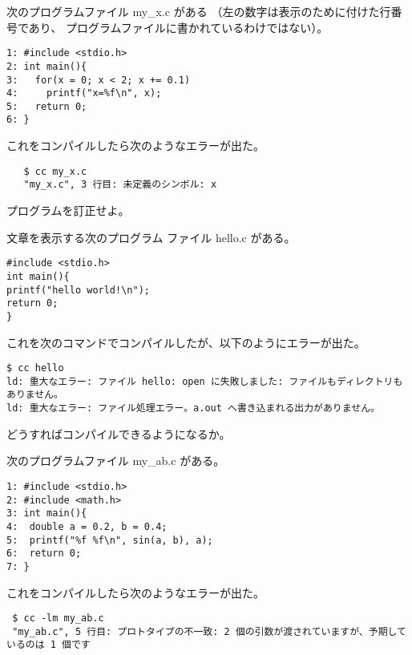 \documentclass[12pt,a4j]{jarticle}
\newcounter{toi}
\def\toi{%
\bigskip\bigskip\noindent
\addtocounter{toi}{1}
\shadowbox{\bfseries\large 問\thetoi}
\nopagebreak[4]\bigskip\nopagebreak[4]
}
\begin{document}


\toi


次のプログラムファイル {\ttfamily my\_x.c} がある
（左の数字は表示のために付けた行番号であり、
プログラムファイルに書かれているわけではない）。
\begin{verbatim}
1: #include <stdio.h>
2: int main(){
3:   for(x = 0; x < 2; x += 0.1)
4:     printf("x=%f\n", x);
5:   return 0;
6: }
\end{verbatim}
これをコンパイルしたら次のようなエラーが出た。
\begin{verbatim}
   $ cc my_x.c
   "my_x.c", 3 行目: 未定義のシンボル: x
\end{verbatim}
プログラムを訂正せよ。






\toi



文章を表示する次のプログラム
ファイル {\ttfamily hello.c} がある。
\begin{verbatim}
#include <stdio.h>
int main(){
printf("hello world!\n");
return 0;
}
\end{verbatim}
これを次のコマンドでコンパイルしたが、以下のようにエラーが出た。

\begin{verbatim}
$ cc hello
ld: 重大なエラー: ファイル hello: open に失敗しました: ファイルもディレクトリもありません。
ld: 重大なエラー: ファイル処理エラー。a.out へ書き込まれる出力がありません。
\end{verbatim}

どうすればコンパイルできるようになるか。





\toi






次のプログラムファイル {\ttfamily my\_ab.c} がある。
\begin{verbatim}
1: #include <stdio.h>
2: #include <math.h>
3: int main(){
4:  double a = 0.2, b = 0.4;
5:  printf("%f %f\n", sin(a, b), a);
6:  return 0;
7: }
\end{verbatim}
これをコンパイルしたら次のようなエラーが出た。

\begin{verbatim}
 $ cc -lm my_ab.c
 "my_ab.c", 5 行目: プロトタイプの不一致: 2 個の引数が渡されていますが、予期しているのは 1 個です
\end{verbatim}
\end{document}

